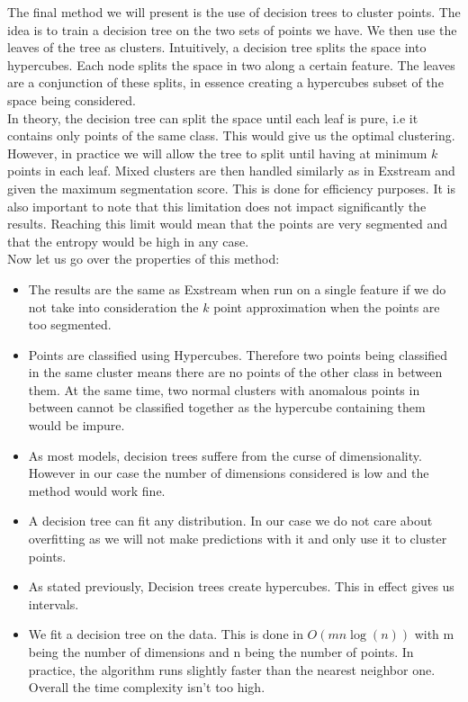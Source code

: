 \documentclass[oneside, a4paper, onecolumn, 11pt]{article}
\begin{document}
The final method we will present is the use of decision trees to cluster points. The idea is to train a decision tree on the two sets of points we have. We then use the leaves of the tree as clusters. Intuitively, a decision tree splits the space into hypercubes. Each node splits the space in two along a certain feature. The leaves are a conjunction of these splits, in essence creating a hypercubes subset of the space being considered. \\
In theory, the decision tree can split the space until each leaf is pure, i.e it contains only points of the same class. This would give us the optimal clustering. However, in practice we will allow the tree to split until having at minimum $k$ points in each leaf. Mixed clusters are then handled similarly as in Exstream and given the maximum segmentation score. This is done for efficiency purposes. It is also important to note that this limitation does not impact significantly the results. Reaching this limit would mean that the points are very segmented and that the entropy would be high in any case.\\
Now let us go over the properties of this method: 
\begin{itemize}
  \item The results are the same as Exstream when run on a single feature if we do not take into consideration the $k$ point approximation when the points are too segmented.
  \item Points are classified using Hypercubes. Therefore two points being classified in the same cluster means there are no points of the other class in between them. At the same time, two normal clusters with anomalous points in between cannot be classified together as the hypercube containing them would be impure.
  \item As most models, decision trees suffere from the curse of dimensionality. However in our case the number of dimensions considered is low and the method would work fine.
  \item A decision tree can fit any distribution. In our case we do not care about overfitting as we will not make predictions with it and only use it to cluster points.
  \item As stated previously, Decision trees create hypercubes. This in effect gives us intervals.
  \item We fit a decision tree on the data. This is done in $O(m n \log(n))$ with m being the number of dimensions and n being the number of points. In practice, the algorithm runs slightly faster than the nearest neighbor one. Overall the time complexity isn't too high.
\end{itemize}
\end{document}
